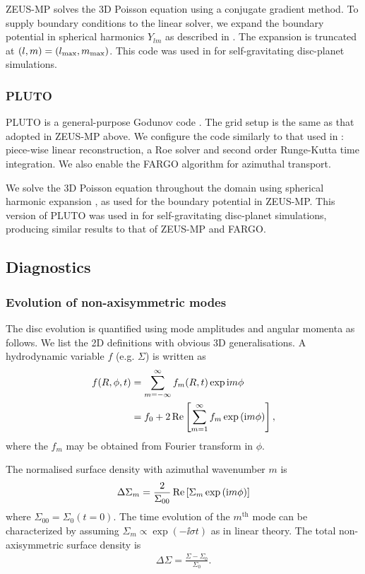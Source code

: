 ZEUS-MP solves the 3D Poisson equation using a conjugate gradient
method. To supply boundary conditions to the linear solver, we
expand the boundary potential in spherical harmonics $Y_{lm}$ 
as described in \cite{boss80}. The expansion is truncated at
$(l,m)=(l_\mathrm{max},m_\mathrm{max})$. This code was used in \cite{lin12b} for
self-gravitating disc-planet simulations.  

\subsubsection{PLUTO} 
PLUTO is a general-purpose Godunov code \citep{mignone07}. The grid
setup is the same as that adopted in ZEUS-MP above. We configure the
code similarly to that used in \cite{lin14}: piece-wise linear
reconstruction, a Roe solver and second order Runge-Kutta time
integration. We also enable the FARGO algorithm for azimuthal
transport. 

We solve the 3D Poisson equation throughout the domain using spherical
harmonic expansion \citep{boss80}, as used for the boundary potential
in ZEUS-MP. This version of PLUTO was used in \cite{lin14b} for
self-gravitating disc-planet simulations, producing similar results to
that of ZEUS-MP and FARGO.   


\subsection{Diagnostics}

\subsubsection{Evolution of non-axisymmetric modes}
The disc evolution is quantified using mode amplitudes and angular
momenta as follows. We list the 2D definitions with obvious 3D generalisations. 
A hydrodynamic variable $f$ (e.g. $\Sigma$) is written as 
\begin{align}
  f(R,\phi,t) &= \sum_{m=-\infty}^{\infty}f_m(R,t)\exp{\mathrm{i}m \phi} \notag\\
  &= f_0 + 2 \operatorname{Re}\left[\sum_{m=1}^\infty f_m \exp{(\mathrm{i}m\phi)}\right], 
\end{align}
where the $f_m$ may be obtained from Fourier transform in $\phi$. 

The normalised surface density with azimuthal wavenumber $m$ is
\begin{align}
  \Delta\Sigma_m = \frac{2}{\Sigma_{00}} \operatorname{Re}\left[\Sigma_m \exp{(\mathrm{i}m\phi)}\right]
\end{align}
where $\Sigma_{00} = \Sigma_0(t=0)$. The time evolution of the
$m^\mathrm{th}$ mode can be characterized by 
assuming $\Sigma_m\propto\exp{(-\ii \sigma t)}$ as in linear
theory. 
The total non-axisymmetric surface density is 
\begin{align}
  \Delta\Sigma = \frac{\Sigma - \Sigma_0}{\Sigma_0}. 
\end{align}

